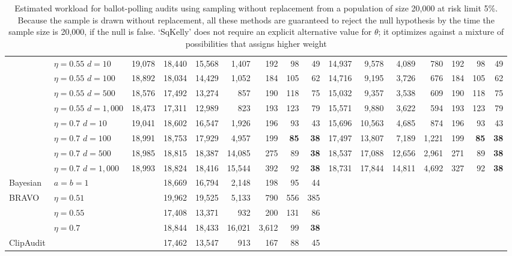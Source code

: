 \documentclass[12pt,runningheads]{llncs}
\begin{document}
{\begin{table}
\begin{tabular}{ll|rrrrrrr|rrrrrrr}
 & $\eta=0.55$ $d=10$ & 19,078  & 18,440  & 15,568  & 1,407  & 192  & 98  & 49  & 14,937  & 9,578  & 4,089  & 780  & 192  & 98  & 49  \\ 
 & $\eta=0.55$ $d=100$ & 18,892  & 18,034  & 14,429  & 1,052  & 184  & 105  & 62  & 14,716  & 9,195  & 3,726  & 676  & 184  & 105  & 62  \\ 
 & $\eta=0.55$ $d=500$ & 18,576  & 17,492  & 13,274  & 857  & 190  & 118  & 75  & 15,032  & 9,357  & 3,538  & 609  & 190  & 118  & 75  \\ 
 & $\eta=0.55$ $d=1{,}000$ & 18,473  & 17,311  & 12,989  & 823  & 193  & 123  & 79  & 15,571  & 9,880  & 3,622  & 594  & 193  & 123  & 79  \\ 
 & $\eta=0.7$ $d=10$ & 19,041  & 18,602  & 16,547  & 1,926  & 196  & 93  & 43  & 15,696  & 10,563  & 4,685  & 874  & 196  & 93  & 43  \\ 
 & $\eta=0.7$ $d=100$ & 18,991  & 18,753  & 17,929  & 4,957  & 199  & \bf{85}  & \bf{38}  & 17,497  & 13,807  & 7,189  & 1,221  & 199  & \bf{85}  & \bf{38}  \\ 
 & $\eta=0.7$ $d=500$ & 18,985  & 18,815  & 18,387  & 14,085  & 275  & 89  & \bf{38}  & 18,537  & 17,088  & 12,656  & 2,961  & 271  & 89  & \bf{38}  \\ 
 & $\eta=0.7$ $d=1{,}000$ & 18,993  & 18,824  & 18,416  & 15,544  & 392  & 92  & \bf{38}  & 18,731  & 17,844  & 14,811  & 4,692  & 327  & 92  & \bf{38}  \\ 
\hline
Bayesian & $a=b=1$ & & 18,669 & 16,794  & 2,148  & 198  & 95  & 44  \\
\hline
BRAVO & $\eta=0.51$ &&19,962 & 19,525  & 5,133  & 790  & 556  & 385  \\
             & $\eta=0.55$ && 17,408 & 13,371  & 932  & 200  & 131  & 86  \\
             & $\eta=0.7$   && 18,844& 18,433  & 16,021  & 3,612  & 99  & \bf{38}  \\
\hline
ClipAudit &      && 17,462 & 13,547  & 913  & 167  & 88  & 45  \\
\hline
\end{tabular} 
\caption{\protect \label{tab:finite-population}
Estimated workload for ballot-polling audits using sampling without replacement from a population of 
size 20,000 at risk limit 5\%.
Because the sample is drawn without replacement, all these methods are guaranteed to reject the null hypothesis by the time
the sample size is 20,000, if the null is false.
`SqKelly' does not require an explicit alternative value for $\theta$; it optimizes against a mixture of possibilities that assigns higher weight
}
\end{table}}
\end{document}

